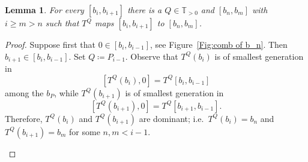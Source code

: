 \documentclass{amsart}
\newcommand{\1}{{\mathbb 1 }}
\newcommand\PT{\mathbb{ T}}
\newtheorem{lem}[thm]{Lemma}
\theoremstyle{remark}
\numberwithin{equation}{section}
\theoremstyle{definition}
\theoremstyle{nonumberbreak}
\begin{document}
\begin{lem}
\label{lem:dynam of domin}
For every $[b_i,b_{i+1}]$ there is a $Q\in \PT_{>0}$ and $[b_n,b_m]$ with $i\ge m>n$ such that $T^Q$ maps $[b_i,b_{i+1}]$ to $[b_n,b_m]$.
\end{lem}
\begin{proof}
Suppose first that $0\in [b_i,b_{i-1}]$, see Figure~\ref{Fig:comb of b_n}. Then $b_{i+1}\in [b_i,b_{i-1}]$. Set $Q\coloneqq P_{i-1}$. Observe that $T^Q(b_i)$ is of smallest generation in \[[T^Q(b_i),0]=T^Q[b_{i},b_{i-1}]\] among the $b_P$, while $T^Q(b_{i+1})$ is of smallest generation in \[[T^Q(b_{i+1}),0]=T^Q[b_{i+1},b_{i-1}].\] Therefore, $T^Q(b_{i})$ and $T^Q(b_{i+1})$ are dominant; i.e.~$T^Q(b_{i})=b_n$ and $T^Q(b_{i+1})=b_m$ for some $n,m<i-1$.

\begin{figure}[tp!]  
\end{figure}
\end{proof}
\end{document}
